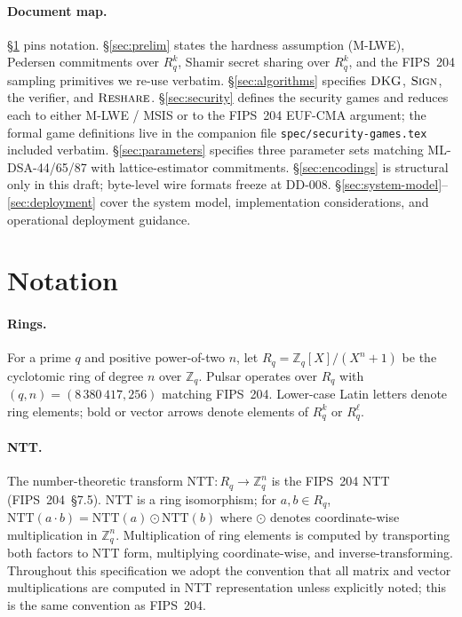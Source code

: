\documentclass[11pt,a4paper]{article}
\theoremstyle{definition}
\theoremstyle{remark}
\newcommand{\Rq}{R_q}
\newcommand{\Zq}{\mathbb{Z}_q}
\newcommand{\NTT}{\mathrm{NTT}}
\newcommand{\Sign}{\textsc{Sign}}
\newcommand{\DKG}{\textsc{DKG}}
\newcommand{\Reshare}{\textsc{Reshare}}
\begin{document}
\paragraph{Document map.}
\S\ref{sec:notation} pins notation. \S\ref{sec:prelim} states the
hardness assumption (M-LWE), Pedersen commitments over $\Rq^k$,
Shamir secret sharing over $\Rq^k$, and the FIPS~204 sampling
primitives we re-use verbatim. \S\ref{sec:algorithms} specifies
$\DKG$, $\Sign$, the verifier, and $\Reshare$.
\S\ref{sec:security} defines the security games and reduces each to
either M-LWE / MSIS or to the FIPS~204 EUF-CMA argument; the formal
game definitions live in the companion file
\texttt{spec/security-games.tex} included verbatim.
\S\ref{sec:parameters} specifies three parameter sets matching
ML-DSA-44/65/87 with lattice-estimator commitments.
\S\ref{sec:encodings} is structural only in this draft; byte-level
wire formats freeze at DD-008.
\S\ref{sec:system-model}--\ref{sec:deployment} cover the system model,
implementation considerations, and operational deployment guidance.

\section{Notation}
\label{sec:notation}

\paragraph{Rings.} For a prime $q$ and positive power-of-two $n$, let
$\Rq = \Zq[X]/(X^n + 1)$ be the cyclotomic ring of degree $n$ over
$\Zq$. Pulsar operates over $\Rq$ with $(q, n) = (8\,380\,417, 256)$
matching FIPS~204. Lower-case Latin letters denote ring elements;
bold or vector arrows denote elements of $\Rq^k$ or $\Rq^\ell$.

\paragraph{NTT.} The number-theoretic transform
$\NTT : \Rq \to \Zq^n$ is the FIPS~204 NTT
(FIPS~204~\S7.5). $\NTT$ is a ring isomorphism; for $a, b \in \Rq$,
$\NTT(a \cdot b) = \NTT(a) \odot \NTT(b)$ where $\odot$ denotes
coordinate-wise multiplication in $\Zq^n$. Multiplication of ring
elements is computed by transporting both factors to NTT form,
multiplying coordinate-wise, and inverse-transforming. Throughout
this specification we adopt the convention that all matrix and
vector multiplications are computed in NTT representation unless
explicitly noted; this is the same convention as FIPS~204.
\end{document}
